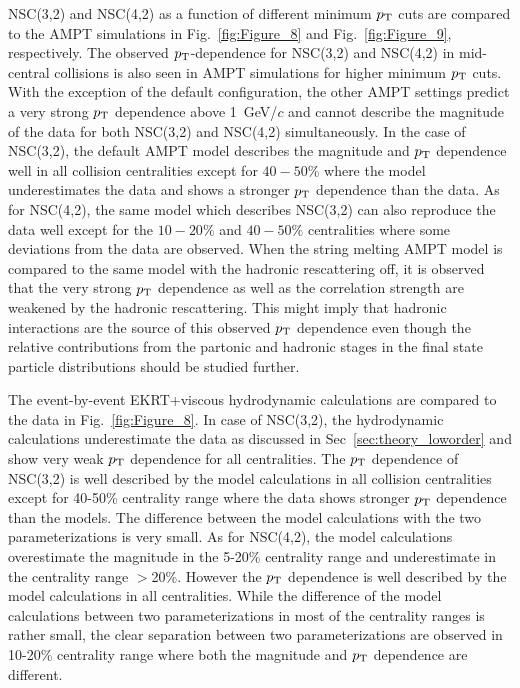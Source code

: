 NSC(3,2) and NSC(4,2) as a function of different minimum $p_{\rm T}$ cuts are compared to the {AMPT} simulations in Fig.~\ref{fig:Figure_8} and Fig.~\ref{fig:Figure_9}, respectively.
The observed $p_{\rm T}$-dependence for NSC(3,2) and NSC(4,2) in mid-central collisions is also seen in AMPT simulations for higher minimum $p_{\rm T}$ cuts.
With the exception of the default configuration, the other AMPT settings predict a very strong $p_{\rm T}$ dependence above 1~GeV/$c$ and cannot describe the magnitude of the data for both NSC(3,2) and NSC(4,2) simultaneously.
In the case of NSC(3,2), the default AMPT model describes the magnitude and $p_{\rm T}$ dependence well in all collision centralities except for $40-50\%$ where the model underestimates the data and shows a stronger $p_{\rm T}$ dependence than the data.
As for  NSC(4,2), the same model which describes NSC(3,2) can also reproduce the data well except for the $10-20\%$ and $40-50\%$ centralities where some deviations from the data are observed.
When the string melting AMPT model is compared to the same model with the hadronic rescattering off, it is observed that the very strong $p_{\rm T}$ dependence as well as the correlation strength are weakened by the hadronic rescattering.
This might imply that hadronic interactions are the source of this observed $p_{\rm T}$ dependence even though the relative contributions from the partonic and hadronic stages in the final state particle distributions should be studied further.

The event-by-event EKRT+viscous hydrodynamic calculations are compared to the data in Fig.~\ref{fig:Figure_8}.
In case of NSC(3,2), the hydrodynamic calculations underestimate the data as discussed in Sec~\ref{sec:theory_loworder} and show very weak $p_{\rm T}$ dependence for all centralities.
The $p_{\rm T}$ dependence of NSC(3,2) is well described by the model calculations in all collision centralities except for 40-50\% centrality range where the data shows stronger $p_{\rm T}$ dependence than the models. The difference between the model calculations with the two parameterizations is very small. 
As for NSC(4,2), the model calculations overestimate the magnitude in the 5-20\% centrality range and underestimate in the centrality range $>$20\%. However the $p_{\rm T}$ dependence is well described by the model calculations in all centralities. 
While the difference of the model calculations between two parameterizations in most of the centrality ranges is rather small, the clear separation between two parameterizations are observed in 10-20\% centrality range where both the magnitude and $p_{\rm T}$ dependence are different.

